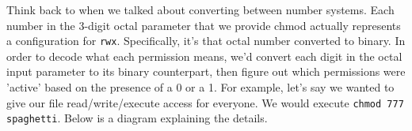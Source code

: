 \documentclass[english, 10pt]{article}
\begin{document}
Think back to when we talked about converting between number systems. Each number in the 3-digit octal parameter that we provide chmod actually represents a configuration for \texttt{rwx}. Specifically, it's that octal number converted to binary. In order to decode what each permission means, we'd convert each digit in the octal input parameter to its binary counterpart, then figure out which permissions were 'active' based on the presence of a 0 or a 1. For example, let's say we wanted to give our file read/write/execute access for everyone. We would execute \texttt{chmod 777 spaghetti}. Below is a diagram explaining the details.\newline

{
\centering



\begin{tikzpicture}[x=0.75pt,y=0.75pt,yscale=-1,xscale=1]


\end{tikzpicture}}
\end{document}
